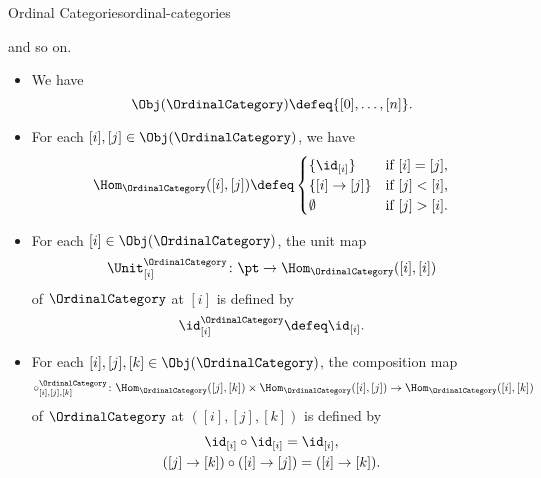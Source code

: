 \begin{example}{Ordinal Categories}{ordinal-categories}
{        and so on.
        \par\vspace*{-2.25\baselineskip}
    }%
    \begin{itemize}
        \item{}We have
            \[
                \Obj(\OrdinalCategory)
                \defeq
                \{[0],\ldots,[n]\}.
            \]%
        \item{}For each $[i],[j]\in\Obj(\OrdinalCategory)$, we have
            \[
                \Hom_{\OrdinalCategory}([i],[j])
                \defeq
                \begin{cases}
                    \{\id_{[i]}\}                &\text{if $[i]=[j]$,}\\
                    \{[i]\to[j]\}    &\text{if $[j]<[i]$,}\\
                    \emptyset                    &\text{if $[j]>[i]$.}
                \end{cases}
            \]%
        \item{}For each $[i]\in\Obj(\OrdinalCategory)$, the unit map
            \[
                \Unit^{\OrdinalCategory}_{[i]}
                \colon
                \pt
                \to
                \Hom_{\OrdinalCategory}([i],[i])
            \]%
            of $\OrdinalCategory$ at $[i]$ is defined by
            \[
                \id^{\OrdinalCategory}_{[i]}
                \defeq
                \id_{[i]}.
            \]%
        \item{}For each $[i],[j],[k]\in\Obj(\OrdinalCategory)$, the composition map
            \[
                \circ^{\OrdinalCategory}_{[i],[j],[k]}
                \colon
                \Hom_{\OrdinalCategory}([j],[k])
                \times
                \Hom_{\OrdinalCategory}([i],[j])
                \to
                \Hom_{\OrdinalCategory}([i],[k])
            \]%
            of $\OrdinalCategory$ at $([i],[j],[k])$ is defined by%
            \[
                \begin{gathered}
                    \id_{[i]}\circ\id_{[i]}                             = \id_{[i]},\\%
                    ([j]\to[k])\circ([i]\to[j]) = ([i]\to[k]).%
                \end{gathered}
            \]%
    \end{itemize}
\end{example}
